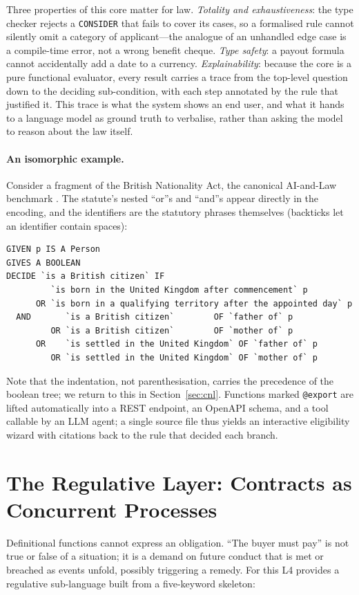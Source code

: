 \documentclass[sigconf,nonacm]{acmart}
\newcommand{\code}[1]{\texttt{\small #1}}
\begin{document}
Three properties of this core matter for law. \emph{Totality and
exhaustiveness}: the type checker rejects a \code{CONSIDER} that fails to
cover its cases, so a formalised rule cannot silently omit a category of
applicant---the analogue of an unhandled edge case is a compile-time error,
not a wrong benefit cheque. \emph{Type safety}: a payout formula cannot
accidentally add a date to a currency. \emph{Explainability}: because the
core is a pure functional evaluator, every result carries a trace from the
top-level question down to the deciding sub-condition, with each step
annotated by the rule that justified it. This trace is what the system shows
an end user, and what it hands to a language model as ground truth to
verbalise, rather than asking the model to reason about the law itself.

\paragraph{An isomorphic example.}
Consider a fragment of the British Nationality Act, the canonical AI-and-Law
benchmark \cite{sergot1986bna}. The statute's nested ``or''s and ``and''s
appear directly in the encoding, and the identifiers are the statutory
phrases themselves (backticks let an identifier contain spaces):

\begin{lstlisting}
GIVEN p IS A Person
GIVES A BOOLEAN
DECIDE `is a British citizen` IF
         `is born in the United Kingdom after commencement` p
      OR `is born in a qualifying territory after the appointed day` p
  AND       `is a British citizen`        OF `father of` p
         OR `is a British citizen`        OF `mother of` p
      OR    `is settled in the United Kingdom` OF `father of` p
         OR `is settled in the United Kingdom` OF `mother of` p
\end{lstlisting}

Note that the indentation, not parenthesisation, carries the precedence of
the boolean tree; we return to this in Section~\ref{sec:cnl}. Functions
marked \code{@export} are lifted automatically into a REST endpoint, an
OpenAPI schema, and a tool callable by an LLM agent; a single source file
thus yields an interactive eligibility wizard with citations back to the
rule that decided each branch.

\section{The Regulative Layer: Contracts as Concurrent Processes}\label{sec:regulative}
Definitional functions cannot express an obligation. ``The buyer must pay''
is not true or false of a situation; it is a demand on future conduct that
is met or breached as events unfold, possibly triggering a remedy. For this
L4 provides a regulative sub-language built from a five-keyword skeleton:
\end{document}
